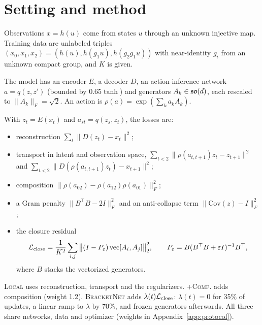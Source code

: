 \section{Setting and method}\label{sec:method}
Observations $x=h(u)$ come from states $u$ through an unknown injective map. Training data are unlabeled triples
$(x_0,x_1,x_2)=(h(u),h(g_1u),h(g_2g_1u))$ with near-identity $g_i$ from an unknown compact group, and $K$ is given.

The model has an encoder $E$, a decoder $D$, an action-inference network $a=q(z,z')$ (bounded by $0.65\tanh$) and
generators $A_k\in\mathfrak{so}(d)$, each rescaled to $\|A_k\|_F=\sqrt2$. An action is $\rho(a)=\exp(\sum_ka_kA_k)$.

With $z_t=E(x_t)$ and $a_{st}=q(z_s,z_t)$, the losses are:
\begin{itemize}
\item reconstruction $\sum_t\|D(z_t)-x_t\|^2$;
\item transport in latent and observation space,
$\sum_{t<2}\|\rho(a_{t,t+1})z_t-z_{t+1}\|^2$ and $\sum_{t<2}\|D(\rho(a_{t,t+1})z_t)-x_{t+1}\|^2$;
\item composition $\|\rho(a_{02})-\rho(a_{12})\rho(a_{01})\|_F^2$;
\item a Gram penalty $\|B^\top B-2I\|_F^2$ and an anti-collapse term $\|\mathrm{Cov}(z)-I\|_F^2$;
\item the closure residual
\begin{equation}\label{eq:close}
\mathcal{L}_{\mathrm{close}}=\frac1{K^2}\sum_{i,j}\big\|(I-P_\varepsilon)\operatorname{vec}[A_i,A_j]\big\|_2^2,\qquad
P_\varepsilon=B(B^\top B+\varepsilon I)^{-1}B^\top,
\end{equation}
where $B$ stacks the vectorized generators.
\end{itemize}

\textsc{Local} uses reconstruction, transport and the regularizers. \textsc{+Comp.} adds composition (weight 1.2).
\textsc{BracketNet} adds $\lambda(t)\mathcal{L}_{\mathrm{close}}$: $\lambda(t)=0$ for 35\% of updates, a linear ramp to $\lambda$ by 70\%,
and frozen generators afterwards. All three share networks, data and optimizer (weights in
Appendix~\ref{app:protocol}).
